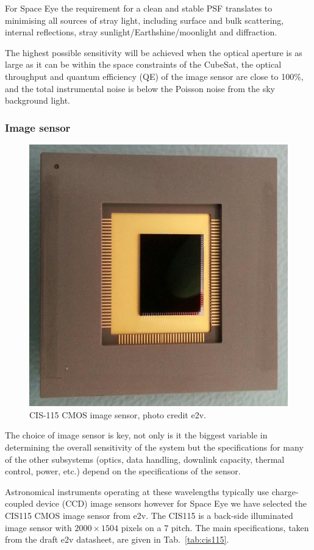 \documentclass[]{iac}
\begin{document}
For Space Eye the requirement for a clean and stable PSF translates to minimising all sources of stray light, including
surface and bulk scattering, internal reflections, stray sunlight/Earthshine/moonlight and diffraction.

The highest possible sensitivity will be achieved when the optical aperture is as large as it can be within the space
constraints of the CubeSat, the optical throughput and quantum efficiency (QE) of the image sensor are close to 100\%,
and the total instrumental noise is below the Poisson noise from the sky background light.

\subsubsection{Image sensor}

\begin{figure}[tp]
  \center \includegraphics[width=0.7\columnwidth]{figures/cis115.png}
  \caption{\label{fig:cis115}CIS-115 CMOS image sensor, photo credit e2v.}
\end{figure}

The choice of image sensor is key, not only is it the biggest variable in determining the overall sensitivity of the
system but the specifications for many of the other subsystems (optics, data handling, downlink capacity, thermal
control, power, etc.) depend on the specifications of the sensor.

Astronomical instruments operating at these wavelengths typically use charge-coupled device (CCD) image sensors however
for Space Eye we have selected the CIS115 CMOS image sensor from e2v\cite{Jorden2014}. The CIS115 is a back-side
illuminated image sensor with $2000 \times 1504$ pixels on a \SI{7}{\micron} pitch. The main specifications, taken from
the draft e2v datasheet, are given in Tab.~\ref{tab:cis115}.
\end{document}
